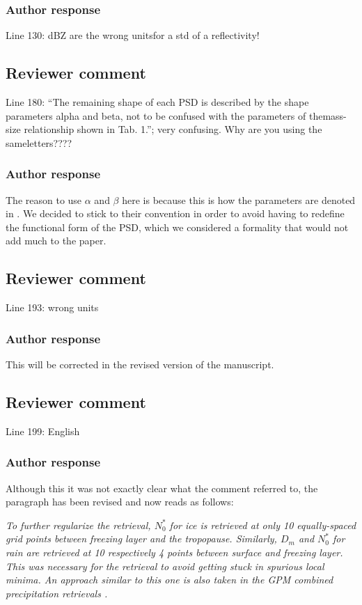 \documentclass[11pt]{scrartcl}
\begin{document}
\subsubsection*{Author response}
Line 130: dBZ are the wrong unitsfor a std of a reflectivity!

\subsection*{Reviewer comment}
Line 180: “The remaining shape of each PSD is described by the shape parameters alpha and beta, not to be confused with the parameters of themass-size relationship shown in Tab. 1.”; very confusing. Why are you using the sameletters????  
\subsubsection*{Author response}

The reason to use $\alpha$ and $\beta$ here is because this is how the
parameters are denoted in \citet{delanoe14}. We decided to stick to their
convention in order to avoid having to redefine the functional form of
the PSD, which we considered a formality that would not add much to the
paper.

\subsection*{Reviewer comment}
Line 193: wrong units 

\subsubsection*{Author response}

This will be corrected in the revised version of the manuscript.

\subsection*{Reviewer comment}
Line 199: English

\subsubsection*{Author response}

Although this it was not exactly clear what the comment referred to, the paragraph
has been revised and now reads as follows:

{\itshape To further regularize the retrieval, $N_0^*$ for ice is retrieved at
  only 10 equally-spaced grid points between freezing layer and the tropopause.
  Similarly, $D_m$ and $N_0^*$ for rain are retrieved at 10 respectively 4
  points between surface and freezing layer. This was necessary for the
  retrieval to avoid getting stuck in spurious local minima. An approach similar
  to this one is also taken in the GPM combined precipitation retrievals
  \citep{grecu16}.}
\end{document}
